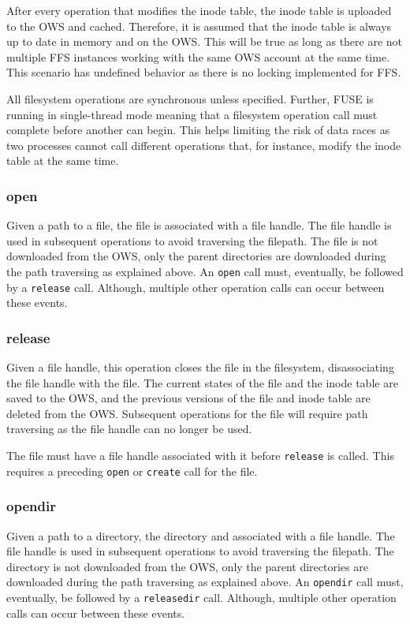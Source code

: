 After every operation that modifies the inode table, the inode table is uploaded to the OWS and cached. Therefore, it is assumed that the inode table is always up to date in memory and on the OWS. This will be true as long as there are not multiple FFS instances working with the same OWS account at the same time. This scenario has undefined behavior as there is no locking implemented for FFS.

All filesystem operations are synchronous unless specified. Further, FUSE is running in single-thread mode meaning that a filesystem operation call must complete before another can begin. This helps limiting the risk of data races as two processes cannot call different operations that, for instance, modify the inode table at the same time.

\subsubsection{open}
Given a path to a file, the file is associated with a file handle. The file handle is used in subsequent operations to avoid traversing the filepath. The file is not downloaded from the OWS, only the parent directories are downloaded during the path traversing as explained above. An \texttt{open} call must, eventually, be followed by a \texttt{release} call. Although, multiple other operation calls can occur between these events.

\subsubsection{release}
Given a file handle, this operation closes the file in the filesystem, disassociating the file handle with the file. The current states of the file and the inode table are saved to the OWS, and the previous versions of the file and inode table are deleted from the OWS. Subsequent operations for the file will require path traversing as the file handle can no longer be used.

The file must have a file handle associated with it before \texttt{release} is called. This requires a preceding \texttt{open} or \texttt{create} call for the file.

\subsubsection{opendir}
Given a path to a directory, the directory and associated with a file handle. The file handle is used in subsequent operations to avoid traversing the filepath. The directory is not downloaded from the OWS, only the parent directories are downloaded during the path traversing as explained above. An \texttt{opendir} call must, eventually, be followed by a \texttt{releasedir} call. Although, multiple other operation calls can occur between these events.

